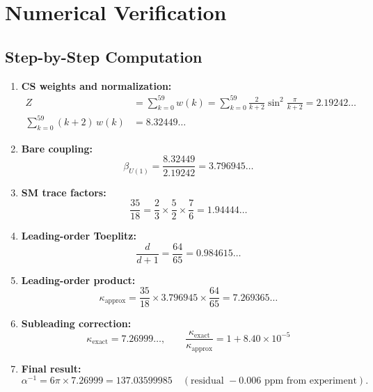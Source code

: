 \documentclass[12pt,a4paper]{article}
\theoremstyle{definition}
\theoremstyle{remark}
\begin{document}
\section{Numerical Verification}
\label{sec:numerics}

\subsection{Step-by-Step Computation}

\begin{enumerate}
\item \textbf{CS weights and normalization:}
\begin{align}
Z &= \sum_{k=0}^{59} w(k)
= \sum_{k=0}^{59} \frac{2}{k+2}\sin^2\!\frac{\pi}{k+2}
= 2.19242\ldots \\
\sum_{k=0}^{59}(k+2)\,w(k) &= 8.32449\ldots
\end{align}

\item \textbf{Bare coupling:}
\begin{equation}
\beta_{U(1)} = \frac{8.32449}{2.19242} = 3.796945\ldots
\end{equation}

\item \textbf{SM trace factors:}
\begin{equation}
\frac{35}{18} = \frac{2}{3} \times \frac{5}{2} \times \frac{7}{6}
= 1.94444\ldots
\end{equation}

\item \textbf{Leading-order Toeplitz:}
\begin{equation}
\frac{d}{d+1} = \frac{64}{65} = 0.984615\ldots
\end{equation}

\item \textbf{Leading-order product:}
\begin{equation}
\kappa_{\mathrm{approx}}
= \frac{35}{18} \times 3.796945 \times \frac{64}{65}
= 7.269365\ldots
\end{equation}

\item \textbf{Subleading correction:}
\begin{equation}
\kappa_{\mathrm{exact}} = 7.26999\ldots, \qquad
\frac{\kappa_{\mathrm{exact}}}{\kappa_{\mathrm{approx}}}
= 1 + 8.40 \times 10^{-5}
\end{equation}

\item \textbf{Final result:}
\begin{equation}
\alpha^{-1} = 6\pi \times 7.26999 = 137.03599985
\quad (\text{residual } -0.006\text{ ppm from experiment}).
\end{equation}
\end{enumerate}
\end{document}
